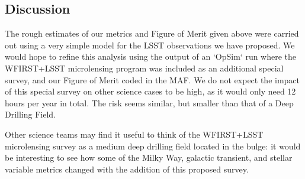 %
%
%
%

\subsection{Discussion}
\label{sec:\secname:discussion}

The rough estimates of our metrics and Figure of Merit given above were
carried out using a very simple model for the LSST observations we
have proposed. We would hope to refine this analysis using the output
of an `OpSim` run where the WFIRST+LSST microlensing program was included
as an additional special survey, and our Figure of Merit coded in the
MAF. We do not expect the impact of this special survey on other science cases
to be high, as it would only need 12 hours per year in total. The risk
seems similar, but smaller than that of a Deep Drilling Field.

Other science teams may find it useful to think of the WFIRST+LSST microlensing
survey as a medium deep drilling field located in the bulge: it would be interesting
to see how some of the Milky Way, galactic transient, and  stellar variable
metrics changed with the addition of this proposed survey.



\navigationbar
